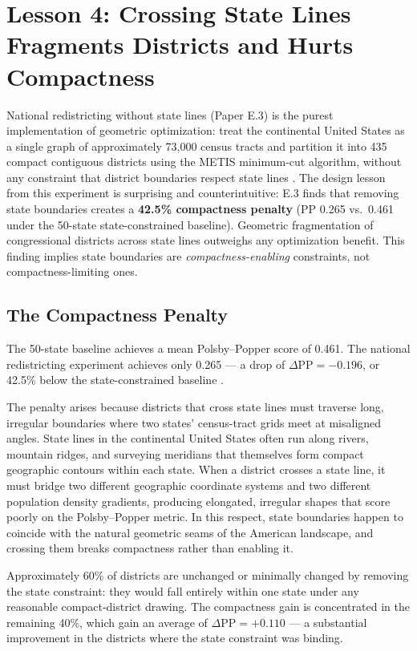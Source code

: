 \section{Lesson 4: Crossing State Lines Fragments Districts and Hurts Compactness}
\label{sec:lesson4}

National redistricting without state lines (Paper E.3) is the purest
implementation of geometric optimization: treat the continental United States
as a single graph of approximately 73,000 census tracts and partition it into
435 compact contiguous districts using the METIS minimum-cut algorithm, without
any constraint that district boundaries respect state lines
\citep{dellaLibera2026e3}.  The design lesson from this experiment is
surprising and counterintuitive: E.3 finds that removing state boundaries
creates a \textbf{42.5\% compactness penalty} (PP 0.265 vs.\ 0.461 under the
50-state state-constrained baseline).
Geometric fragmentation of congressional districts across state lines
outweighs any optimization benefit.
This finding implies state boundaries are \emph{compactness-enabling} constraints,
not compactness-limiting ones.

\subsection{The Compactness Penalty}

The 50-state baseline achieves a mean Polsby--Popper score of 0.461.
The national redistricting experiment achieves only 0.265 --- a drop of
$\Delta\mathrm{PP} = -0.196$, or 42.5\% below the state-constrained baseline
\citep{dellaLibera2026e3}.

The penalty arises because districts that cross state lines must traverse
long, irregular boundaries where two states' census-tract grids meet at
misaligned angles.
State lines in the continental United States often run along rivers, mountain
ridges, and surveying meridians that themselves form compact geographic contours
within each state.
When a district crosses a state line, it must bridge two different geographic
coordinate systems and two different population density gradients, producing
elongated, irregular shapes that score poorly on the Polsby--Popper metric.
In this respect, state boundaries happen to coincide with the natural geometric
seams of the American landscape, and crossing them breaks compactness rather
than enabling it.

Approximately 60\% of districts are unchanged or minimally changed by removing
the state constraint: they would fall entirely within one state under any
reasonable compact-district drawing.  The compactness gain is concentrated in
the remaining 40\%, which gain an average of $\Delta\mathrm{PP} = +0.110$
--- a substantial improvement in the districts where the state constraint
was binding.

